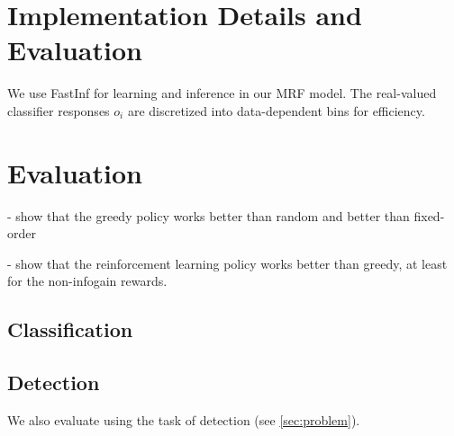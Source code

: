 \documentclass[runningheads]{llncs}
\begin{document}
\section{Implementation Details and Evaluation} \label{sec:implementation}
We use FastInf \cite{Jaimovich2010} for learning and inference in our MRF model.
The real-valued classifier responses $o_i$ are discretized into data-dependent bins for efficiency.

\section{Evaluation} \label{sec:evaluation}
- show that the greedy policy works better than random and better than fixed-order

- show that the reinforcement learning policy works better than greedy, at least for the non-infogain rewards.

\subsection{Classification}

\subsection{Detection}
We also evaluate using the task of detection (see \autoref{sec:problem}).




\end{document}
